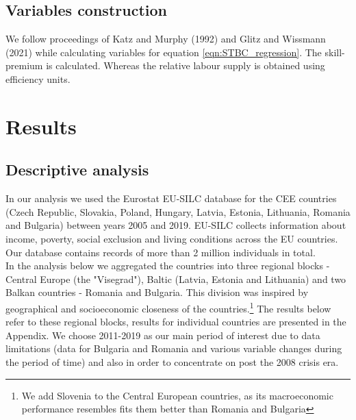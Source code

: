 \documentclass{article}
\begin{document}
\subsection{Variables construction}
We follow proceedings of Katz and Murphy (1992) and Glitz and Wissmann (2021) while calculating variables for equation \ref{eqn:STBC_regression}. The skill-premium is calculated. Whereas the relative labour supply is obtained using efficiency units.


\section{Results}
\subsection{Descriptive analysis}
In our analysis we used the Eurostat EU-SILC database for the CEE countries (Czech Republic, Slovakia, Poland, Hungary, Latvia, Estonia, Lithuania, Romania and Bulgaria) between years 2005 and 2019. EU-SILC collects information about income, poverty, social exclusion and living conditions across the EU countries. Our database contains records of more than 2 million individuals in total.\\ In the analysis below we aggregated the countries into three regional blocks - Central Europe (the "Visegrad"), Baltic (Latvia, Estonia and Lithuania) and two Balkan countries - Romania and Bulgaria. This division was inspired by geographical and socioeconomic closeness of the countries.\footnote{We add Slovenia to the Central European countries, as its macroeconomic performance resembles fits them better than Romania and Bulgaria} %
The results below refer to these regional blocks, results for individual countries are presented in the Appendix. We choose 2011-2019 as our main period of interest due to data limitations (data for Bulgaria and Romania and various variable changes during the period of time) and also in order to concentrate on post the 2008 crisis era.
\end{document}

